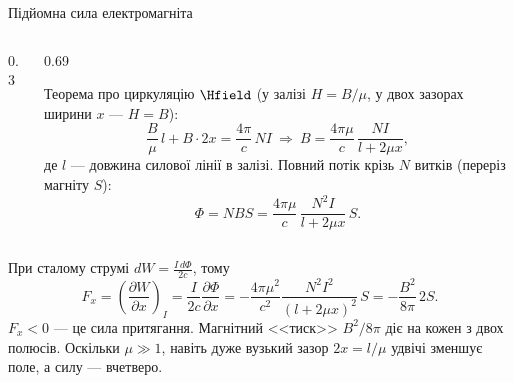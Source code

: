 \documentclass[onlytextwidth]{beamer}
\begin{document}
\begin{frame}{Підйомна сила електромагніта}{}\small
	\begin{columns}
		\begin{column}{0.3\linewidth}
			
		\end{column}
		\begin{column}{0.69\linewidth}
			\begin{block}{}\justifying
				Теорема про циркуляцію $\Hfield$ (у залізі $H = B/\mu$, у двох зазорах ширини $x$ --- $H = B$):
				\begin{equation*}
					\frac{B}{\mu}\, l + B\cdot 2x = \frac{4\pi}{c}\, NI
					\ \Rightarrow\
					B = \frac{4\pi\mu}{c}\, \frac{NI}{l + 2\mu x},
				\end{equation*}
				де $l$ --- довжина силової лінії в залізі. Повний потік крізь $N$ витків (переріз магніту $S$):
				\begin{equation*}
					\Phi = NBS = \frac{4\pi\mu}{c}\, \frac{N^2I}{l + 2\mu x}\, S.
				\end{equation*}
			\end{block}
		\end{column}
	\end{columns}
	\begin{block}{}\justifying
		При сталому струмі $dW = \frac{I\,d\Phi}{2c}$, тому
		\begin{equation*}
			F_x = \left( \frac{\partial W}{\partial x} \right)_{I} = \frac{I}{2c} \frac{\partial \Phi}{\partial x} = -\frac{4\pi\mu^2}{c^2}\frac{N^2I^2}{(l + 2\mu
				x)^2}\, S = -\frac{B^2}{8\pi}\, 2S.
		\end{equation*}
		$F_x < 0$ --- це сила притягання. Магнітний <<тиск>> $B^2/8\pi$ діє на кожен з двох полюсів. Оскільки $\mu \gg 1$, навіть дуже вузький
		зазор $2x = l/\mu$ удвічі зменшує поле, а силу --- вчетверо.
	\end{block}
\end{frame}
\end{document}
